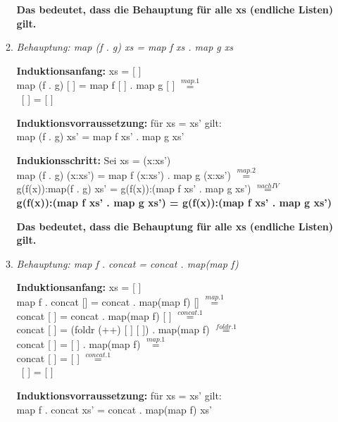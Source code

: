 \documentclass[11pt]{article}
\begin{document}
\begin{enumerate}
\begin{enumerate}
\vspace*{0.5cm}
\textbf{Das bedeutet, dass die Behauptung für alle xs (endliche Listen) gilt.}

\vspace*{0.5cm}
\item
\textit{Behauptung: map (f . g) xs = map f xs . map g xs}

\vspace*{0.5cm}
\textbf{Induktionsanfang:} xs = [ ]\\
map (f . g) [ ] = map f [ ] . map g [ ] $\stackrel{map.1}{=}$\\
\ [ ] = [ ]


\vspace*{0.5cm}
\textbf{Induktionsvorraussetzung:} für xs = xs' gilt:\\
map (f . g) xs' = map f xs' . map g xs'

\vspace*{0.5cm}
\textbf{Indukionsschritt:} Sei xs = (x:xs')\\
map (f . g) (x:xs') = map f (x:xs') . map g (x:xs') $\stackrel{map.2}{=}$\\
g(f(x)):map(f . g) xs' = g(f(x)):(map f xs' . map g xs') $\stackrel{nach IV}{=}$\\
\textbf{g(f(x)):(map f xs' . map g xs') = g(f(x)):(map f xs' . map g xs')}

\vspace*{0.5cm}
\textbf{Das bedeutet, dass die Behauptung für alle xs (endliche Listen) gilt.}

\vspace*{0.5cm}
\item
\textit{Behauptung: map f . concat = concat . map(map f)}

\vspace*{0.5cm}
\textbf{Induktionsanfang:} xs = [ ]\\
map f . concat [] = concat . map(map f) [] $\stackrel{map.1}{=}$\\
concat [ ] = concat . map(map f) [ ] $\stackrel{concat.1}{=}$\\
concat [ ] = (foldr (++) [ ] [ ]) . map(map f) $\stackrel{foldr.1}{=}$\\
concat [ ] = [ ] . map(map f) $\stackrel{map.1}{=}$\\
concat [ ] = [ ] $\stackrel{concat.1}{=}$\\
\ [ ] = [ ]


\vspace*{0.5cm}
\textbf{Induktionsvorraussetzung:} für xs = xs' gilt:\\
map f . concat xs' = concat . map(map f) xs'


\end{enumerate}
\end{enumerate}
\end{document}
